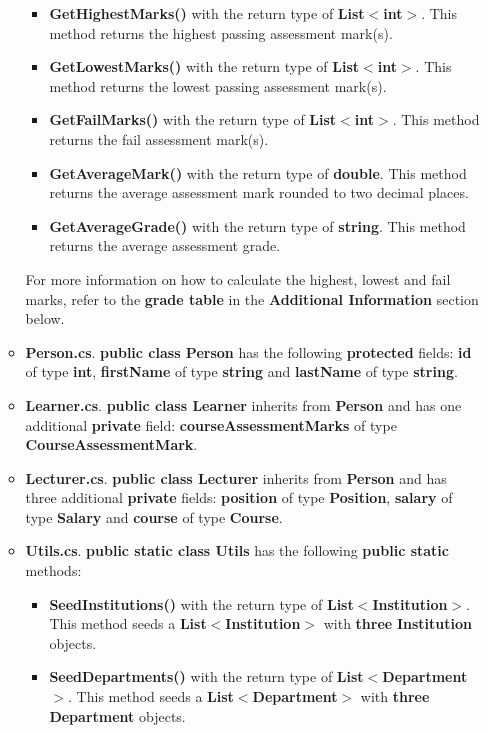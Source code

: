 \documentclass{article}
\begin{document}
\begin{itemize}
\begin{itemize}
\begin{itemize}
            \item \textbf{GetHighestMarks()} with the return type of \textbf{List$<$int$>$}. This method returns the highest passing assessment mark(s).
            \item \textbf{GetLowestMarks()} with the return type of \textbf{List$<$int$>$}. This method returns the lowest passing assessment mark(s). 
            \item \textbf{GetFailMarks()} with the return type of \textbf{List$<$int$>$}. This method returns the fail assessment mark(s).
            \item \textbf{GetAverageMark()} with the return type of \textbf{double}. This method returns the average assessment mark rounded to two decimal places.
            \item \textbf{GetAverageGrade()} with the return type of \textbf{string}. This method returns the average assessment grade.
        \end{itemize}
        For more information on how to calculate the highest, lowest and fail marks, refer to the \textbf{grade table} in the \textbf{Additional Information} section below.
        \item \textbf{Person.cs}. \textbf{public class Person} has the following \textbf{protected} fields: \textbf{id} of type \textbf{int}, \textbf{firstName} of type \textbf{string} and \textbf{lastName} of type \textbf{string}.
        \item \textbf{Learner.cs}. \textbf{public class Learner} inherits from \textbf{Person} and has one additional \textbf{private} field: \textbf{courseAssessmentMarks} of type \textbf{CourseAssessmentMark}.
        \item \textbf{Lecturer.cs}. \textbf{public class Lecturer} inherits from \textbf{Person} and has three additional \textbf{private} fields: \textbf{position} of type \textbf{Position}, \textbf{salary} of type \textbf{Salary} and \textbf{course} of type \textbf{Course}.
        \item \textbf{Utils.cs}. \textbf{public static class Utils} has the following \textbf{public static} methods:
        \begin{itemize}
            \item \textbf{SeedInstitutions()} with the return type of \textbf{List$<$Institution$>$}. This method seeds a \textbf{List$<$Institution$>$} with \textbf{three} \textbf{Institution} objects.
            \item \textbf{SeedDepartments()} with the return type of \textbf{List$<$Department$>$}. This method seeds a \textbf{List$<$Department$>$} with \textbf{three} \textbf{Department} objects.

\end{itemize}
\end{itemize}
\end{itemize}
\end{document}
